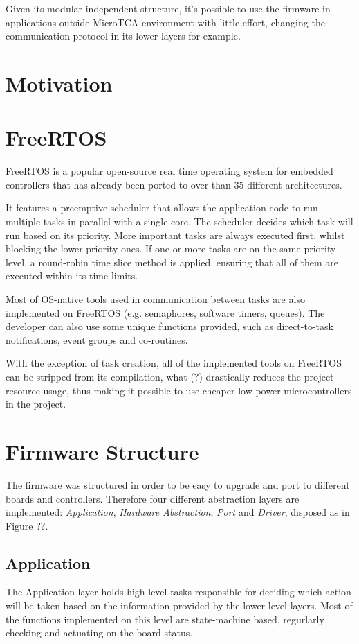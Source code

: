 \documentclass[a4paper,
              ]{jacow}
\begin{document}
Given its modular independent structure, it's possible to use the firmware in applications outside MicroTCA environment with little effort, changing the communication protocol in its lower layers for example.

\section{Motivation}


\section{FreeRTOS}
FreeRTOS is a popular open-source real time operating system for embedded controllers that has already been ported to over than 35 different architectures.

It features a preemptive scheduler that allows the application code to run multiple tasks in parallel with a single core.
The scheduler decides which task will run based on its priority. More important tasks are always executed first, whilst blocking the lower priority ones.
If one or more tasks are on the same priority level, a round-robin time slice method is applied, ensuring that all of them are executed within its time limits.

Most of OS-native tools used in communication between tasks are also implemented on FreeRTOS (e.g. semaphores, software timers, queues).
The developer can also use some unique functions provided, such as direct-to-task notifications, event groups and co-routines.

With the exception of task creation, all of the implemented tools on FreeRTOS can be stripped from its compilation, what (?) drastically reduces the project resource usage,
thus making it possible to use cheaper low-power microcontrollers in the project.

\section{Firmware Structure}
The firmware was structured in order to be easy to upgrade and port to different boards and controllers.
Therefore four different abstraction layers are implemented: \emph{Application}, \emph{Hardware Abstraction}, \emph{Port} and \emph{Driver}, disposed as in Figure ??.


\subsection{Application}
The Application layer holds high-level tasks responsible for deciding which action will be taken based on the information provided by the lower level layers. Most of the functions implemented on this level are state-machine based, regurlarly checking and actuating on the board status.
\end{document}
